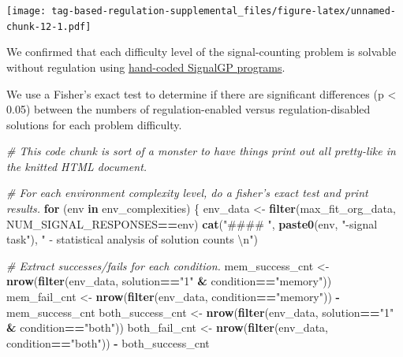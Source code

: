 \documentclass[]{book}
\newenvironment{Shaded}{\begin{snugshade}}{\end{snugshade}}
\newcommand{\CharTok}[1]{\textcolor[rgb]{0.31,0.60,0.02}{#1}}
\newcommand{\CommentTok}[1]{\textcolor[rgb]{0.56,0.35,0.01}{\textit{#1}}}
\newcommand{\ControlFlowTok}[1]{\textcolor[rgb]{0.13,0.29,0.53}{\textbf{#1}}}
\newcommand{\KeywordTok}[1]{\textcolor[rgb]{0.13,0.29,0.53}{\textbf{#1}}}
\newcommand{\NormalTok}[1]{#1}
\newcommand{\OperatorTok}[1]{\textcolor[rgb]{0.81,0.36,0.00}{\textbf{#1}}}
\newcommand{\StringTok}[1]{\textcolor[rgb]{0.31,0.60,0.02}{#1}}
\begin{document}
\texttt{[image: tag-based-regulation-supplemental\_files/figure-latex/unnamed-chunk-12-1.pdf]}

We confirmed that each difficulty level of the signal-counting problem is solvable without regulation using \href{https://github.com/amlalejini/Tag-based-Genetic-Regulation-for-LinearGP/blob/master/documents/handcoded-examples.md}{hand-coded SignalGP programs}.

We use a Fisher's exact test to determine if there are significant differences (p \textless{} 0.05) between the numbers of regulation-enabled versus regulation-disabled solutions for each problem difficulty.

\begin{Shaded}
\begin{Highlighting}[]
\CommentTok{# This code chunk is sort of a monster to have things print out all pretty-like in the knitted HTML document.}

\CommentTok{# For each environment complexity level, do a fisher's exact test and print results.}
\ControlFlowTok{for}\NormalTok{ (env }\ControlFlowTok{in}\NormalTok{ env_complexities) \{}
\NormalTok{  env_data <-}\StringTok{ }\KeywordTok{filter}\NormalTok{(max_fit_org_data, NUM_SIGNAL_RESPONSES}\OperatorTok{==}\NormalTok{env)}
  \KeywordTok{cat}\NormalTok{(}\StringTok{"#### "}\NormalTok{, }\KeywordTok{paste0}\NormalTok{(env, }\StringTok{"-signal task"}\NormalTok{), }\StringTok{" - statistical analysis of solution counts  }\CharTok{\textbackslash{}n}\StringTok{"}\NormalTok{)}

  \CommentTok{# Extract successes/fails for each condition.}
\NormalTok{  mem_success_cnt <-}\StringTok{ }\KeywordTok{nrow}\NormalTok{(}\KeywordTok{filter}\NormalTok{(env_data, solution}\OperatorTok{==}\StringTok{"1"} \OperatorTok{&}\StringTok{ }\NormalTok{condition}\OperatorTok{==}\StringTok{"memory"}\NormalTok{))}
\NormalTok{  mem_fail_cnt <-}\StringTok{ }\KeywordTok{nrow}\NormalTok{(}\KeywordTok{filter}\NormalTok{(env_data, condition}\OperatorTok{==}\StringTok{"memory"}\NormalTok{)) }\OperatorTok{-}\StringTok{ }\NormalTok{mem_success_cnt}
\NormalTok{  both_success_cnt <-}\StringTok{ }\KeywordTok{nrow}\NormalTok{(}\KeywordTok{filter}\NormalTok{(env_data, solution}\OperatorTok{==}\StringTok{"1"} \OperatorTok{&}\StringTok{ }\NormalTok{condition}\OperatorTok{==}\StringTok{"both"}\NormalTok{))}
\NormalTok{  both_fail_cnt <-}\StringTok{ }\KeywordTok{nrow}\NormalTok{(}\KeywordTok{filter}\NormalTok{(env_data, condition}\OperatorTok{==}\StringTok{"both"}\NormalTok{)) }\OperatorTok{-}\StringTok{ }\NormalTok{both_success_cnt}


\end{Highlighting}
\end{Shaded}
\end{document}
